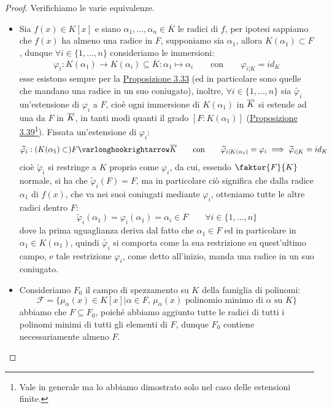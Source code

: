 \documentclass[11pt]{scrartcl}
\begin{document}
\begin{proof}
    Verifichiamo le varie equivalenze.
    \begin{itemize}
        \item[$\boxed{(1)\implies (2)}$] Sia $f(x) \in K[x]$ e siano $\alpha_1,\ldots,\alpha_n \in \overline K$ le radici di $f$, per ipotesi sappiamo che $f(x)$ ha almeno una radice in $F$, supponiamo sia $\alpha_1$, allora $K(\alpha_1) \subset F$, dunque
        $\forall i \in \{1,\ldots,n\}$ consideriamo le immersioni:
        \[ \varphi_i : K(\alpha_1) \longrightarrow K(\alpha_i) \subseteq \overline K : \alpha_1 \longmapsto \alpha_i \qquad \text{con} \qquad \varphi_{i|K} = id_K
            \]
        esse esistono sempre per la \hyperref[3.33]{Proposizione 3.33} (ed in particolare sono quelle che mandano una radice in un suo coniugato), inoltre, $\forall i \in \{1,\ldots,n\}$ sia $\widetilde{\varphi_i}$ un'estensione di $\varphi_i$ a $F$, cioè ogni immersione di $K(\alpha_1)$ in $\overline K$ si estende ad una da $F$ in $\overline K$,
        in tanti modi quanti il grado $[F : K(\alpha_1)]$ (\hyperref[3.39]{Proposizione 3.39}\footnote{Vale in generale ma lo abbiamo dimostrato solo nel caso delle estensioni finite.}). Fissata un'estensione di $\varphi_i$:
        \[ \widetilde{\varphi_i} : (K(\alpha_1) \subset)F \varlonghookrightarrow \overline K \qquad \text{con} \qquad \widetilde{\varphi}_{i|K(\alpha_1)} = \varphi_i \implies \widetilde{\varphi}_{i|K} = id_K
            \]
        cioè $\widetilde{\varphi}_i$ si restringe a $K$ proprio come $\varphi_i$, da cui, essendo $\faktor{F}{K}$ normale, si ha che $\widetilde{\varphi}_i(F) = F$, ma in particolare ciò significa che
        dalla radice $\alpha_1$ di $f(x)$, che va nei suoi coniugati mediante $\varphi_i$, otteniamo tutte le altre radici dentro $F$:
        \[ \widetilde{\varphi}_i(\alpha_1) = \varphi_i(\alpha_1) = \alpha_i \in F \qquad \forall i \in \{1,\ldots,n\}
            \]
        dove la prima uguaglianza deriva dal fatto che $\alpha_1 \in F$ ed in particolare in $\alpha_1 \in K(\alpha_1)$, quindi $\widetilde{\varphi_i}$ si comporta come la sua restrizione su quest'ultimo campo, e tale restrizione $\varphi_i$, come detto all'inizio, manda una radice in un suo coniugato.
        \item[$\boxed{(2)\implies (3)}$] Consideriamo $F_0$ il campo di spezzamento su $K$ della famiglia di polinomi:
        \[ \mathcal{F} = \{\mu_\alpha(x) \in K[x] | \alpha \in F, \, \text{$\mu_\alpha(x)$ polinomio minimo di $\alpha$ su $K$}\}
            \]
        abbiamo che $F \subseteq F_0$, poiché abbiamo aggiunto tutte le radici di tutti i polinomi minimi di tutti gli elementi di $F$, dunque $F_0$ contiene necessariamente almeno $F$.

\end{itemize}
\end{proof}
\end{document}

